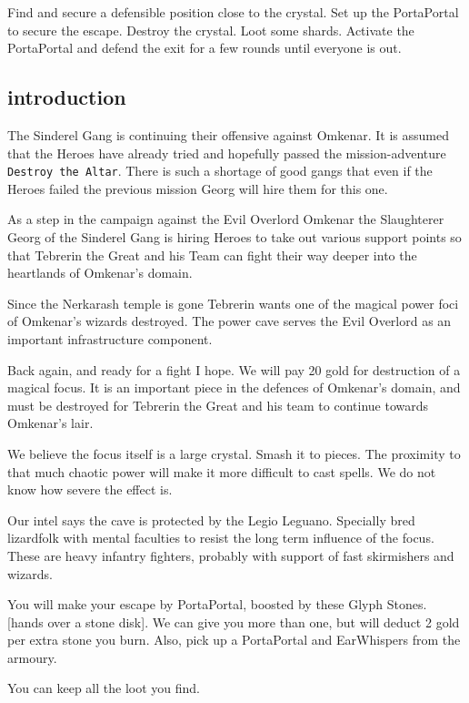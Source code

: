 Find and secure a defensible position close to the crystal. Set up the PortaPortal to secure the escape. Destroy the crystal. Loot some shards. Activate the PortaPortal and defend the exit for a few rounds until everyone is out.











\subsection*{introduction}
The Sinderel Gang is continuing their offensive against Omkenar. It is assumed that the Heroes have already tried and hopefully passed the mission-adventure \texttt{Destroy the Altar}. There is such a shortage of good gangs that even if the Heroes failed the previous mission Georg will hire them for this one.

As a step in the campaign against the Evil Overlord Omkenar the Slaughterer Georg of the Sinderel Gang is hiring Heroes to take out various support points so that Tebrerin the Great and his Team can fight their way deeper into the heartlands of Omkenar's domain.

Since the Nerkarash temple is gone Tebrerin wants one of the magical power foci of Omkenar's wizards destroyed. The power cave serves the Evil Overlord as an important infrastructure component.

\begin{readoutloud}
Back again, and ready for a fight I hope. We will pay 20 gold for destruction of a magical focus. It is an important piece in the defences of Omkenar's domain, and must be destroyed for Tebrerin the Great and his team to continue towards Omkenar's lair.

We believe the focus itself is a large crystal. Smash it to pieces. The proximity to that much chaotic power will make it more difficult to cast spells. We do not know how severe the effect is.

Our intel says the cave is protected by the Legio Leguano. Specially bred lizardfolk with mental faculties to resist the long term influence of the focus. These are heavy infantry fighters, probably with support of fast skirmishers and wizards.

You will make your escape by PortaPortal, boosted by these Glyph Stones. [hands over a stone disk]. We can give you more than one, but will deduct 2 gold per extra stone you burn. Also, pick up a PortaPortal and EarWhispers from the armoury.

You can keep all the loot you find.
\end{readoutloud}

